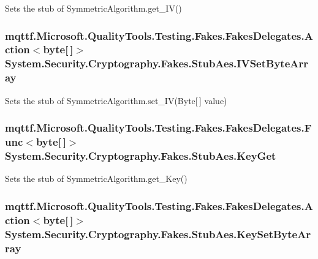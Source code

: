 Sets the stub of Symmetric\-Algorithm.\-get\-\_\-\-I\-V()

\hypertarget{class_system_1_1_security_1_1_cryptography_1_1_fakes_1_1_stub_aes_a399ba1e8b889f5ff0a015bd4ef7bc90e}{
\subsubsection[{I\-V\-Set\-Byte\-Array}]{\setlength{\rightskip}{0pt plus 5cm}mqttf.\-Microsoft.\-Quality\-Tools.\-Testing.\-Fakes.\-Fakes\-Delegates.\-Action$<$byte\mbox{[}$\,$\mbox{]}$>$ System.\-Security.\-Cryptography.\-Fakes.\-Stub\-Aes.\-I\-V\-Set\-Byte\-Array}}\label{class_system_1_1_security_1_1_cryptography_1_1_fakes_1_1_stub_aes_a399ba1e8b889f5ff0a015bd4ef7bc90e}


Sets the stub of Symmetric\-Algorithm.\-set\-\_\-\-I\-V(\-Byte\mbox{[}$\,$\mbox{]} value)

\hypertarget{class_system_1_1_security_1_1_cryptography_1_1_fakes_1_1_stub_aes_aba889227a180d164a6a3cf5cbaf80ca2}{
\subsubsection[{Key\-Get}]{\setlength{\rightskip}{0pt plus 5cm}mqttf.\-Microsoft.\-Quality\-Tools.\-Testing.\-Fakes.\-Fakes\-Delegates.\-Func$<$byte\mbox{[}$\,$\mbox{]}$>$ System.\-Security.\-Cryptography.\-Fakes.\-Stub\-Aes.\-Key\-Get}}\label{class_system_1_1_security_1_1_cryptography_1_1_fakes_1_1_stub_aes_aba889227a180d164a6a3cf5cbaf80ca2}


Sets the stub of Symmetric\-Algorithm.\-get\-\_\-\-Key()

\hypertarget{class_system_1_1_security_1_1_cryptography_1_1_fakes_1_1_stub_aes_abe40b0fb832ae48c6ba660d09660346f}{
\subsubsection[{Key\-Set\-Byte\-Array}]{\setlength{\rightskip}{0pt plus 5cm}mqttf.\-Microsoft.\-Quality\-Tools.\-Testing.\-Fakes.\-Fakes\-Delegates.\-Action$<$byte\mbox{[}$\,$\mbox{]}$>$ System.\-Security.\-Cryptography.\-Fakes.\-Stub\-Aes.\-Key\-Set\-Byte\-Array}}\label{class_system_1_1_security_1_1_cryptography_1_1_fakes_1_1_stub_aes_abe40b0fb832ae48c6ba660d09660346f}


